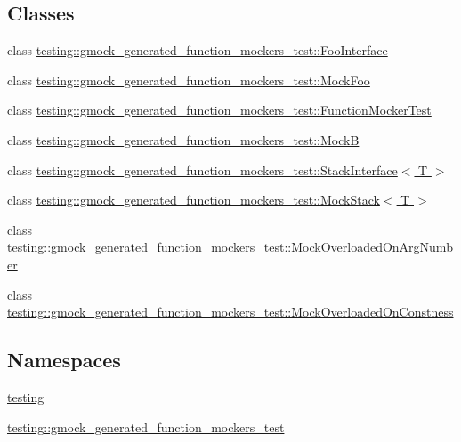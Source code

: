 \subsection*{Classes}
\begin{DoxyCompactItemize}
\item 
class \hyperlink{classtesting_1_1gmock__generated__function__mockers__test_1_1_foo_interface}{testing\+::gmock\+\_\+generated\+\_\+function\+\_\+mockers\+\_\+test\+::\+Foo\+Interface}
\item 
class \hyperlink{classtesting_1_1gmock__generated__function__mockers__test_1_1_mock_foo}{testing\+::gmock\+\_\+generated\+\_\+function\+\_\+mockers\+\_\+test\+::\+Mock\+Foo}
\item 
class \hyperlink{classtesting_1_1gmock__generated__function__mockers__test_1_1_function_mocker_test}{testing\+::gmock\+\_\+generated\+\_\+function\+\_\+mockers\+\_\+test\+::\+Function\+Mocker\+Test}
\item 
class \hyperlink{classtesting_1_1gmock__generated__function__mockers__test_1_1_mock_b}{testing\+::gmock\+\_\+generated\+\_\+function\+\_\+mockers\+\_\+test\+::\+MockB}
\item 
class \hyperlink{classtesting_1_1gmock__generated__function__mockers__test_1_1_stack_interface}{testing\+::gmock\+\_\+generated\+\_\+function\+\_\+mockers\+\_\+test\+::\+Stack\+Interface$<$ T $>$}
\item 
class \hyperlink{classtesting_1_1gmock__generated__function__mockers__test_1_1_mock_stack}{testing\+::gmock\+\_\+generated\+\_\+function\+\_\+mockers\+\_\+test\+::\+Mock\+Stack$<$ T $>$}
\item 
class \hyperlink{classtesting_1_1gmock__generated__function__mockers__test_1_1_mock_overloaded_on_arg_number}{testing\+::gmock\+\_\+generated\+\_\+function\+\_\+mockers\+\_\+test\+::\+Mock\+Overloaded\+On\+Arg\+Number}
\item 
class \hyperlink{classtesting_1_1gmock__generated__function__mockers__test_1_1_mock_overloaded_on_constness}{testing\+::gmock\+\_\+generated\+\_\+function\+\_\+mockers\+\_\+test\+::\+Mock\+Overloaded\+On\+Constness}
\end{DoxyCompactItemize}
\subsection*{Namespaces}
\begin{DoxyCompactItemize}
\item 
 \hyperlink{namespacetesting}{testing}
\item 
 \hyperlink{namespacetesting_1_1gmock__generated__function__mockers__test}{testing\+::gmock\+\_\+generated\+\_\+function\+\_\+mockers\+\_\+test}
\end{DoxyCompactItemize}
